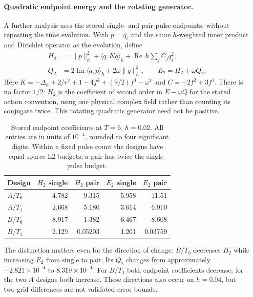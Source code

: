 \paragraph{Quadratic endpoint energy and the rotating generator.}
A further analysis uses the stored single- and pair-pulse endpoints,
without repeating the time evolution. With $p=q_t$ and the same
$h$-weighted inner product and Dirichlet operator as the evolution,
define
\begin{align}
 H_2&=\|p\|_h^2+\langle q,Kq\rangle_h
       +\operatorname{Re}\,h\sum_j C_j q_j^2,
       \label{eq:endpoint-generator}\\
 Q_2&=2\operatorname{Im}\langle q,p\rangle_h
       +2\omega\|q\|_h^2,\qquad E_2=H_2+\omega Q_2.
       \label{eq:endpoint-energy}
\end{align}
Here $K=-\Delta_h+2/r^2+1-4f^2+(9/2)f^4-\omega^2$ and
$C=-2f^2+3f^4$. There is no factor $1/2$: $H_2$ is the coefficient
of second order in $E-\omega Q$ for the stated action convention,
using one physical complex field rather than counting its conjugate twice.
This rotating quadratic generator need not be positive.

\begin{table}[htbp]\centering
\caption{Stored endpoint coefficients at $T=6$, $h=0.02$.
All entries are in units of $10^{-4}$, rounded to four significant digits.
Within a fixed pulse count the designs have equal source-L2 budgets;
a pair has twice the single-pulse budget.}
\label{tab:endpoint-energy}
\begin{tabular}{lrrrr}\toprule
Design&$H_2$ single&$H_2$ pair&$E_2$ single&$E_2$ pair\\\midrule
$A/T_0$&4.782&9.315&5.958&11.51\\
$A/T_1$&2.668&5.180&3.614&6.910\\
$B/T_0$&8.917&1.382&6.467&8.608\\
$B/T_1$&2.129&0.05203&1.201&0.03759\\\bottomrule
\end{tabular}
\end{table}
The distinction matters even for the direction of change:
$B/T_0$ decreases $H_2$ while increasing $E_2$ from single to pair.
Its $Q_2$ changes from approximately $-2.821\times10^{-4}$ to
$8.319\times10^{-4}$. For $B/T_1$ both endpoint coefficients decrease;
for the two $A$ designs both increase. These directions also occur on
$h=0.04$, but two-grid differences are not validated error bounds.

